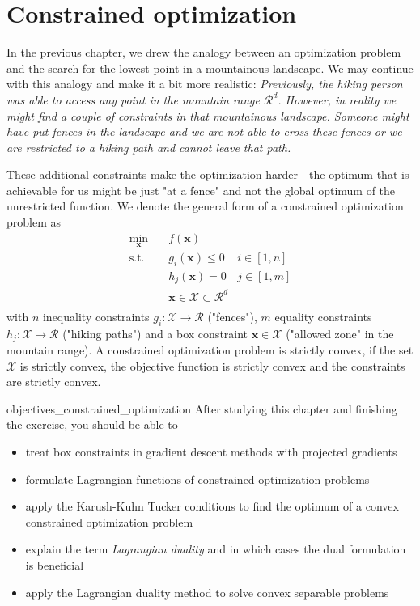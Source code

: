 \chapter{Constrained optimization}
In the previous chapter, we drew the analogy between an optimization problem and the search for the lowest point in a mountainous landscape. We may continue with this analogy and make it a bit more realistic: \emph{Previously, the hiking person was able to access any point in the mountain range $\mathcal{R}^d$. However, in reality we might find a couple of constraints in that mountainous landscape. Someone might have put fences in the landscape and we are not able to cross these fences or we are restricted to a hiking path and cannot leave that path.}

These additional constraints make the optimization harder - the optimum that is achievable for us might be just "at a fence" and not the global optimum of the unrestricted function.
We denote the general form of a constrained optimization problem as 
\begin{equation}
    \begin{aligned}
        \min_{\mathbf{x}} \quad & f(\mathbf{x})\\
        \textrm{s.t.} \quad & g_i(\mathbf{x}) \le 0    &i \in [1, n]\\
                            & h_j(\mathbf{x}) = 0  &j \in [1, m]\\
                            & \mathbf{x} \in \mathcal{X} \subset \mathcal{R}^d\\
    \end{aligned}
    \label{eq:constrained_optimization}
\end{equation}
with $n$ inequality constraints $g_i : \mathcal{X} \rightarrow \mathcal{R}$ ("fences"), $m$ equality constraints $h_j: \mathcal{X} \rightarrow \mathcal{R}$ ("hiking paths") and a box constraint $\mathbf{x} \in \mathcal{X}$ ("allowed zone" in the mountain range). A constrained optimization problem is strictly convex, if the set $\mathcal{X}$ is strictly convex, the objective function is strictly convex and the constraints are strictly convex.

\begin{objectives}{}{objectives_constrained_optimization}
After studying this chapter and finishing the exercise, you should be able to 
\begin{itemize}[label=$\dots$]
    \item treat box constraints in gradient descent methods with projected gradients
    \item formulate Lagrangian functions of constrained optimization problems
    \item apply the Karush-Kuhn Tucker conditions to find the optimum of a convex constrained optimization problem
    \item explain the term \emph{Lagrangian duality} and in which cases the dual formulation is beneficial
    \item apply the Lagrangian duality method to solve convex separable problems
\end{itemize}
\end{objectives}

